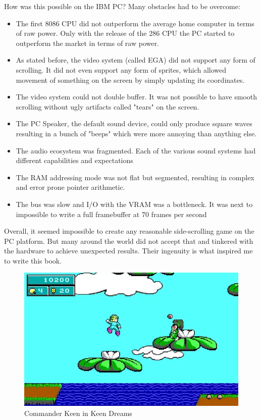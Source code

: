 How was this possible on the IBM PC? Many obstacles had to be overcome:
\begin{itemize}
  \item The first 8086 CPU did not outperform the average home computer in terms of raw power. Only with the release of the 286 CPU the PC started to outperform the market in terms of raw power.
  \item As stated before, the video system (called EGA) did not support any form of scrolling. It did not even support any form of sprites, which allowed movement of something on the screen by simply updating its  coordinates.
  \item The video system could not double buffer. It was not possible to have smooth scrolling without ugly artifacts called "tears" on the screen.
  \item The PC Speaker, the default sound device, could only produce square waves resulting in a bunch of "beeps" which were more annoying than anything else.
  \item The audio ecosystem was fragmented. Each of the various sound systems had
different capabilities and expectations
  \item The RAM addressing mode was not flat but segmented, resulting in complex and
error prone pointer arithmetic.
  \item The bus was slow and I/O with the VRAM was a bottleneck. It was next to impossible to write a full framebuffer at 70 frames per second
\end{itemize}
\par



Overall, it seemed impossible to create any reasonable side-scrolling game on the PC platform. But many around the world did not accept that and tinkered with the hardware to achieve unexpected results. Their ingenuity is what inspired me to write this book. \\


\begin{figure}[H]
  \centering
 \includegraphics[width=1.0\textwidth]{screenshots_300dpi/Keen_Dreams.png}
\caption{Commander Keen in Keen Dreams}
\end{figure}

